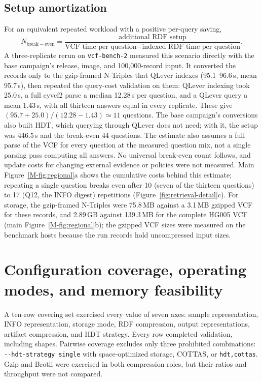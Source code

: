 \documentclass[11pt]{article}
\begin{document}
\subsection{Setup amortization}\label{subsec:measurements-setup}
For an equivalent repeated workload with a positive per-query saving,
\begin{equation}
N_{\mathrm{break-even}}=\frac{\text{additional RDF setup}}{\text{VCF time per question}-\text{indexed RDF time per question}}.
\end{equation}
A three-replicate rerun on \texttt{vcf-bench-2} measured this scenario directly with the base campaign's release, image, and 100,000-record input.
It converted the records only to the gzip-framed N-Triples that QLever indexes (95.1--96.6\,s, mean 95.7\,s), then repeated the query-cost validation on them: QLever indexing took 25.0\,s, a full cyvcf2 parse a median 12.28\,s per question, and a QLever query a mean 1.43\,s, with all thirteen answers equal in every replicate.
These give $(95.7+25.0)/(12.28-1.43)\simeq11$ questions.
The base campaign's conversions also built HDT, which querying through QLever does not need; with it, the setup was 446.5\,s and the break-even 44 questions.
The estimate also assumes a full parse of the VCF for every question at the measured question mix, not a single parsing pass computing all answers.
No universal break-even count follows, and update costs for changing external evidence or policies were not measured.
Main Figure~\ref{M-fig:regional}a shows the cumulative costs behind this estimate; repeating a single question breaks even after 10 (seven of the thirteen questions) to 17 (Q12, the INFO digest) repetitions (Figure~\ref{fig:retrieval-detail}c).
For storage, the gzip-framed N-Triples were 75.8\,MB against a 3.1\,MB gzipped VCF for these records, and 2.89\,GB against 139.3\,MB for the complete HG005 VCF (main Figure~\ref{M-fig:regional}b); the gzipped VCF sizes were measured on the benchmark hosts because the run records hold uncompressed input sizes.


\section{Configuration coverage, operating modes, and memory feasibility}\label{sec:config}
A ten-row covering set exercised every value of seven axes: sample representation, INFO representation, storage mode, RDF compression, output representations, artifact compression, and HDT strategy.
Every row completed validation, including shapes.
Pairwise coverage excludes only three prohibited combinations: \texttt{-{}-hdt-strategy single} with space-optimized storage, COTTAS, or \texttt{hdt,cottas}.
Gzip and Brotli were exercised in both compression roles, but their ratios and throughput were not compared.
\end{document}

